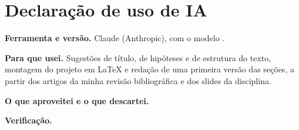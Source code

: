 \chapter*{\thispagestyle{empty}\centering Declaração de uso de IA}
\onehalfspacing
{}

\textbf{Ferramenta e versão.} Claude (Anthropic), com o modelo .

\textbf{Para que usei.} Sugestões de título, de hipóteses e de estrutura do texto, montagem do projeto em LaTeX e redação de uma primeira versão das seções, a partir dos artigos da minha revisão bibliográfica e dos slides da disciplina.

\textbf{O que aproveitei e o que descartei.} 

\textbf{Verificação.} 
